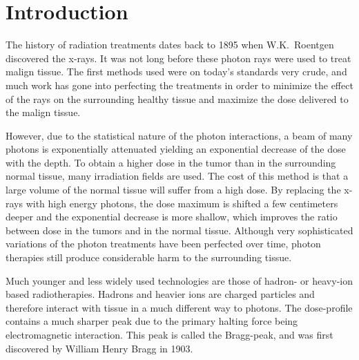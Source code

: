 \section{Introduction}
\thispagestyle{empty}
The history of radiation treatments dates back to 1895 when W.K.~Roentgen discovered the x-rays. It was not long before these photon rays were used to treat malign tissue. The first methods used were on today's standards very crude, and much work has gone into perfecting the treatments in order to minimize the effect of the rays on the surrounding healthy tissue and maximize the dose delivered to the malign tissue.

However, due to the statistical nature of the photon interactions, a beam of many photons is
exponentially attenuated yielding an exponential decrease of the dose with the depth. To
obtain a higher dose in the tumor than in the surrounding normal tissue, many irradiation
fields are used. The cost of this method is that a large volume of the normal tissue
will suffer from a high dose. By replacing the x-rays with high energy photons, the dose
maximum is shifted a few centimeters deeper and the exponential decrease is more shallow,
which improves the ratio between dose in the tumors and in the normal tissue. Although very sophisticated variations of the photon treatments have been perfected over time, photon therapies still produce considerable harm to the surrounding tissue. 

Much younger and less widely used technologies are those of hadron- or heavy-ion based radiotherapies. Hadrons and heavier ions are charged particles and therefore interact with tissue in a much different way to photons. The dose-profile contains a much sharper peak due to the primary halting force being electromagnetic interaction. This peak is called the Bragg-peak, and was first discovered by William Henry Bragg in 1903.

